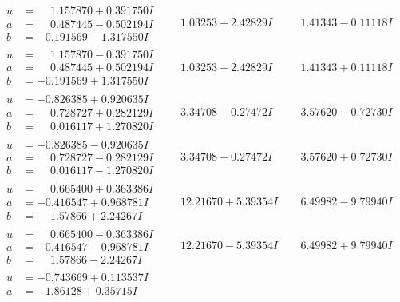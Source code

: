 \documentclass[1p]{elsarticle_modified}
\theoremstyle{definition}
\begin{document}
$$\begin{array}{c|c|c}
\begin{aligned}
u &= \phantom{-}1.157870 + 0.391750 I \\
a &= \phantom{-}0.487445 - 0.502194 I \\
b &= -0.191569 - 1.317550 I\end{aligned}
 & \phantom{-}1.03253 + 2.42829 I & \phantom{-}1.41343 - 0.11118 I \\ \hline\begin{aligned}
u &= \phantom{-}1.157870 - 0.391750 I \\
a &= \phantom{-}0.487445 + 0.502194 I \\
b &= -0.191569 + 1.317550 I\end{aligned}
 & \phantom{-}1.03253 - 2.42829 I & \phantom{-}1.41343 + 0.11118 I \\ \hline\begin{aligned}
u &= -0.826385 + 0.920635 I \\
a &= \phantom{-}0.728727 + 0.282129 I \\
b &= \phantom{-}0.016117 + 1.270820 I\end{aligned}
 & \phantom{-}3.34708 - 0.27472 I & \phantom{-}3.57620 - 0.72730 I \\ \hline\begin{aligned}
u &= -0.826385 - 0.920635 I \\
a &= \phantom{-}0.728727 - 0.282129 I \\
b &= \phantom{-}0.016117 - 1.270820 I\end{aligned}
 & \phantom{-}3.34708 + 0.27472 I & \phantom{-}3.57620 + 0.72730 I \\ \hline\begin{aligned}
u &= \phantom{-}0.665400 + 0.363386 I \\
a &= -0.416547 + 0.968781 I \\
b &= \phantom{-}1.57866 + 2.24267 I\end{aligned}
 & \phantom{-}12.21670 + 5.39354 I & \phantom{-}6.49982 - 9.79940 I \\ \hline\begin{aligned}
u &= \phantom{-}0.665400 - 0.363386 I \\
a &= -0.416547 - 0.968781 I \\
b &= \phantom{-}1.57866 - 2.24267 I\end{aligned}
 & \phantom{-}12.21670 - 5.39354 I & \phantom{-}6.49982 + 9.79940 I \\ \hline\begin{aligned}
u &= -0.743669 + 0.113537 I \\
a &= -1.86128 + 0.35715 I \\

\end{aligned}
\end{array}$$
\end{document}
